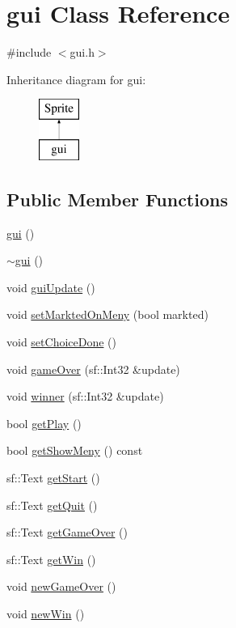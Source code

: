 \hypertarget{classgui}{\section{gui Class Reference}
\label{classgui}
}


{\ttfamily \#include $<$gui.\-h$>$}

Inheritance diagram for gui\-:\begin{figure}[H]
\begin{center}
\leavevmode
\includegraphics[height=2.000000cm]{classgui}
\end{center}
\end{figure}
\subsection*{Public Member Functions}
\begin{DoxyCompactItemize}
\item 
\hyperlink{classgui_a83e2c722e7fec575b45b9cb33b73607d}{gui} ()
\item 
\hyperlink{classgui_aec3eac5e4971812949be5e1a8a82ce55}{$\sim$gui} ()
\item 
void \hyperlink{classgui_adb0d03c56fce76b17a4884da45819525}{gui\-Update} ()
\item 
void \hyperlink{classgui_af6e2c9f41dae730e0b981ede035ca17c}{set\-Markted\-On\-Meny} (bool markted)
\item 
void \hyperlink{classgui_ab9d74152a7940692cb0c7a6edae1a9c3}{set\-Choice\-Done} ()
\item 
void \hyperlink{classgui_ad0d717e33022d183e43c88271ca5223e}{game\-Over} (sf\-::\-Int32 \&update)
\item 
void \hyperlink{classgui_ae28760870545c851ce09dfc691a4cd48}{winner} (sf\-::\-Int32 \&update)
\item 
bool \hyperlink{classgui_a7740e38a83ea37765bc62d3b18e9a944}{get\-Play} ()
\item 
bool \hyperlink{classgui_a7366788ae4d6c53f8a9474482d20490a}{get\-Show\-Meny} () const 
\item 
sf\-::\-Text \hyperlink{classgui_a9ff3aea558d1d738b33af5faece0c278}{get\-Start} ()
\item 
sf\-::\-Text \hyperlink{classgui_ada8b28974e6d5d6f6419f9d9aa8c3324}{get\-Quit} ()
\item 
sf\-::\-Text \hyperlink{classgui_a01078d72a91a9c5d224f3069a16aaf49}{get\-Game\-Over} ()
\item 
sf\-::\-Text \hyperlink{classgui_ad8947f61e2f74be47ef6c729fcb7352c}{get\-Win} ()
\item 
void \hyperlink{classgui_a106730791e450bc2a0d1022c3b28089e}{new\-Game\-Over} ()
\item 
void \hyperlink{classgui_ade8187f38b25d416a36cea7385c29cc6}{new\-Win} ()
\end{DoxyCompactItemize}


